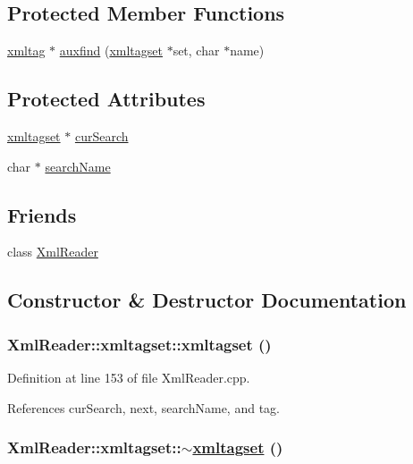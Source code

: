 \subsection*{Protected Member Functions}
\begin{CompactItemize}
\item 
\hyperlink{classXmlReader_1_1xmltag}{xmltag} $\ast$ \hyperlink{classXmlReader_1_1xmltagset_b0}{auxfind} (\hyperlink{classXmlReader_1_1xmltagset}{xmltagset} $\ast$set, char $\ast$name)
\end{CompactItemize}
\subsection*{Protected Attributes}
\begin{CompactItemize}
\item 
\hyperlink{classXmlReader_1_1xmltagset}{xmltagset} $\ast$ \hyperlink{classXmlReader_1_1xmltagset_p0}{cur\-Search}
\item 
char $\ast$ \hyperlink{classXmlReader_1_1xmltagset_p1}{search\-Name}
\end{CompactItemize}
\subsection*{Friends}
\begin{CompactItemize}
\item 
class \hyperlink{classXmlReader_1_1xmltagset_n0}{Xml\-Reader}
\end{CompactItemize}


\subsection{Constructor \& Destructor Documentation}
\hypertarget{classXmlReader_1_1xmltagset_a0}{
\subsubsection[xmltagset]{\setlength{\rightskip}{0pt plus 5cm}Xml\-Reader::xmltagset::xmltagset ()}}
\label{classXmlReader_1_1xmltagset_a0}




Definition at line 153 of file Xml\-Reader.cpp.

References cur\-Search, next, search\-Name, and tag.\hypertarget{classXmlReader_1_1xmltagset_a1}{
\subsubsection[$\sim$xmltagset]{\setlength{\rightskip}{0pt plus 5cm}Xml\-Reader::xmltagset::$\sim$\hyperlink{classXmlReader_1_1xmltagset}{xmltagset} ()}}
\label{classXmlReader_1_1xmltagset_a1}




